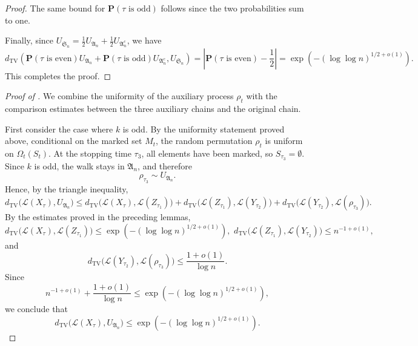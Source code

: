 \begin{proof}
The same bound for \(\mathbf P(\tau\text{ is odd})\) follows since the two probabilities sum to one.

Finally, since $U_{\mathfrak S_n}=\frac12 U_{\mathfrak A_n}
+\frac12 U_{\mathfrak A_n^c}$, we have
\begin{equation}
d_{\mathrm{TV}}\left(
\mathbf P(\tau \text{ is even})U_{\mathfrak A_n}+\mathbf P(\tau \text{ is odd})U_{\mathfrak A_n^c},U_{\mathfrak S_n}\right)
=\left|\mathbf P(\tau \text{ is even})-\frac12\right|=\exp\left(-(\log \log n)^{1/2+o(1)}\right). 
\end{equation}
This completes the proof.
\end{proof}





\begin{proof}[Proof of ]
We combine the uniformity of the auxiliary process \(\rho_t\) with the comparison estimates between the three auxiliary chains and the original chain.

First consider the case where \(k\) is odd. By the uniformity statement proved above, conditional on the marked set \(M_t\), the random permutation \(\rho_t\) is uniform on \(\Omega_t(S_t)\). At the stopping time \(\tau_3\), all elements have been marked, so \(S_{\tau_3}=\emptyset\). Since \(k\) is odd, the walk stays in \(\mathfrak A_n\), and therefore
$$
\rho_{\tau_3}\sim U_{\mathfrak A_n}.
$$
Hence, by the triangle inequality,
$$
d_{\mathrm{TV}}\bigl(\mathcal L(X_\tau),U_{\mathfrak A_n}\bigr)\leq
d_{\mathrm{TV}}\bigl(\mathcal L(X_\tau),\mathcal L(Z_{\tau_1})\bigr)
+d_{\mathrm{TV}}\bigl(\mathcal L(Z_{\tau_1}),\mathcal L(Y_{\tau_2})\bigr) 
+d_{\mathrm{TV}}\bigl(\mathcal L(Y_{\tau_2}),\mathcal L(\rho_{\tau_3})\bigr).
$$
By the estimates proved in the preceding lemmas,
$$
d_{\mathrm{TV}}\bigl(\mathcal L(X_\tau),\mathcal L(Z_{\tau_1})\bigr)
\leq
\exp\left(-(\log\log n)^{1/2+o(1)}\right),\,\,
d_{\mathrm{TV}}\bigl(\mathcal L(Z_{\tau_1}),\mathcal L(Y_{\tau_2})\bigr)
\leq
n^{-1+o(1)},
$$
and
$$
d_{\mathrm{TV}}\bigl(\mathcal L(Y_{\tau_2}),\mathcal L(\rho_{\tau_3})\bigr)
\leq
\frac{1+o(1)}{\log n}.
$$
Since
$$
n^{-1+o(1)}+\frac{1+o(1)}{\log n}
\leq
\exp\left(-(\log\log n)^{1/2+o(1)}\right),
$$
we conclude that
$$
d_{\mathrm{TV}}\bigl(\mathcal L(X_\tau),U_{\mathfrak A_n}\bigr)
\leq
\exp\left(-(\log\log n)^{1/2+o(1)}\right).
$$


\end{proof}
